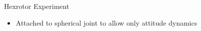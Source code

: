 \begin{frame}{Hexrotor Experiment} %
\begin{itemize}
    \item Attached to spherical joint to allow only attitude dynamics
\end{itemize}
\begin{figure}
\centering
{} 
\end{figure}
\end{frame}   %

